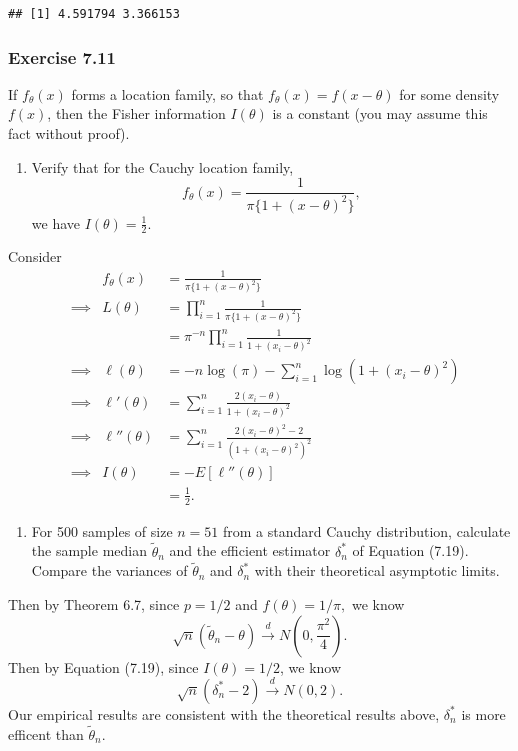 \documentclass[12pt,]{article}
\providecommand{\tightlist}{%
  \setlength{\itemsep}{0pt}\setlength{\parskip}{0pt}}
\begin{document}
\begin{verbatim}
## [1] 4.591794 3.366153
\end{verbatim}

\hypertarget{exercise-7.11}{%
\subsubsection{Exercise 7.11}\label{exercise-7.11}}

If \(f_\theta(x)\) forms a location family, so that
\(f_\theta(x)=f(x-\theta)\) for some density \(f(x)\), then the Fisher
information \(I(\theta)\) is a constant (you may assume this fact
without proof).

\begin{enumerate}
\def\labelenumi{(\alph{enumi})}
\tightlist
\item
  Verify that for the Cauchy location family,
  \[f_\theta(x)=\frac{1}{\pi\{1+(x-\theta)^2\}},\] we have
  \(I(\theta)=\frac{1}{2}\).
\end{enumerate}

Consider \begin{align*}
&&f_\theta(x)&=\frac{1}{\pi\{1+(x-\theta)^2\}}\\
&\implies&L(\theta)&=\prod_{i=1}^n\frac{1}{\pi\{1+(x-\theta)^2\}}\\
&&&=\pi^{-n}\prod_{i=1}^n\frac{1}{1+(x_i-\theta)^2}\\
&\implies&\ell(\theta)&=-n\log(\pi)-\sum_{i=1}^n\log(1+(x_i-\theta)^2)\\
&\implies&\ell'(\theta)&=\sum_{i=1}^n\frac{2(x_i-\theta)}{1+(x_i-\theta)^2}\\
&\implies&\ell''(\theta)&=\sum_{i=1}^n\frac{2(x_i-\theta)^2-2}{(1+(x_i-\theta)^2)^2}\\
&\implies&I(\theta)&=-E[\ell''(\theta)]\\
&&&=\frac{1}{2}.
\end{align*}

\begin{enumerate}
\def\labelenumi{(\alph{enumi})}
\setcounter{enumi}{1}
\tightlist
\item
  For 500 samples of size \(n=51\) from a standard Cauchy distribution,
  calculate the sample median \(\tilde \theta_n\) and the efficient
  estimator \(\delta_n^*\) of Equation (7.19). Compare the variances of
  \(\tilde\theta_n\) and \(\delta_n^*\) with their theoretical
  asymptotic limits.
\end{enumerate}

Then by Theorem 6.7, since \(p=1/2\) and \(f(\theta)=1/\pi,\) we know
\[\sqrt{n}(\tilde\theta_n-\theta)\overset{d}\rightarrow N\left(0,\frac{\pi^2}{4}\right).\]
Then by Equation (7.19), since \(I(\theta)=1/2\), we know
\[\sqrt{n}(\delta^*_n-2)\overset{d}\rightarrow N(0,2).\] Our empirical
results are consistent with the theoretical results above,
\(\delta^*_n\) is more efficent than \(\tilde \theta_n.\)
\end{document}

